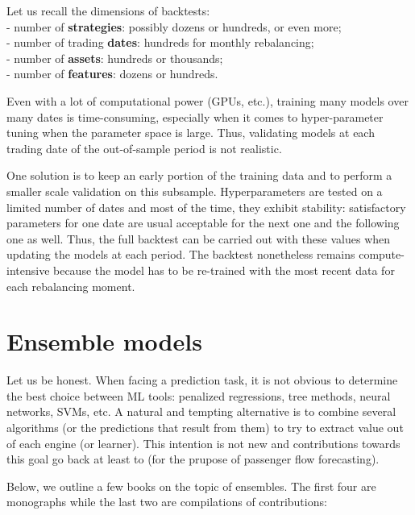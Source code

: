 \documentclass[]{krantz}
\theoremstyle{definition}
\theoremstyle{definition}
\theoremstyle{definition}
\theoremstyle{remark}
\begin{document}
Let us recall the dimensions of backtests:\\
- number of \textbf{strategies}: possibly dozens or hundreds, or even
more;\\
- number of trading \textbf{dates}: hundreds for monthly rebalancing;\\
- number of \textbf{assets}: hundreds or thousands;\\
- number of \textbf{features}: dozens or hundreds.

Even with a lot of computational power (GPUs, etc.), training many
models over many dates is time-consuming, especially when it comes to
hyper-parameter tuning when the parameter space is large. Thus,
validating models at each trading date of the out-of-sample period is
not realistic.

One solution is to keep an early portion of the training data and to
perform a smaller scale validation on this subsample. Hyperparameters
are tested on a limited number of dates and most of the time, they
exhibit stability: satisfactory parameters for one date are usual
acceptable for the next one and the following one as well. Thus, the
full backtest can be carried out with these values when updating the
models at each period. The backtest nonetheless remains
compute-intensive because the model has to be re-trained with the most
recent data for each rebalancing moment.

\hypertarget{ensemble}{%
\chapter{Ensemble models}\label{ensemble}}

Let us be honest. When facing a prediction task, it is not obvious to
determine the best choice between ML tools: penalized regressions, tree
methods, neural networks, SVMs, etc. A natural and tempting alternative
is to combine several algorithms (or the predictions that result from
them) to try to extract value out of each engine (or learner). This
intention is not new and contributions towards this goal go back at
least to \citet{bates1969combination} (for the prupose of passenger flow
forecasting).

Below, we outline a few books on the topic of ensembles. The first four
are monographs while the last two are compilations of contributions:
\end{document}
